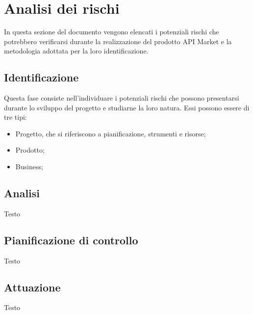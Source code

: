 \newpage
\section{Analisi dei rischi}
In questa sezione del documento vengono elencati i potenziali rischi che potrebbero verificarsi durante la realizzazione del prodotto API Market e la metodologia adottata per la loro identificazione.

\subsection{Identificazione}
Questa fase consiste nell'individuare i potenziali rischi che possono presentarsi durante lo sviluppo del progetto e studiarne la loro natura. Essi possono essere di tre tipi:
\begin{itemize}
	\item Progetto, che si riferiscono a pianificazione, strumenti e risorse;
	\item Prodotto;
	\item Business;
\end{itemize}

\subsection{Analisi}
Testo

\subsection{Pianificazione di controllo}
Testo

\subsection{Attuazione}
Testo

